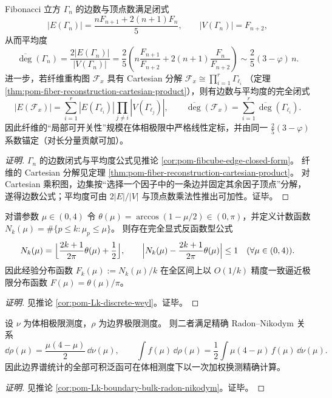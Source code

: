 \begin{conclusion}\label{con:xi-terminal-fibcube-edge-avg-degree-closed}
Fibonacci 立方 \(\Gamma_n\) 的边数与顶点数满足闭式
\[
|E(\Gamma_n)|=\frac{nF_{n+1}+2(n+1)F_n}{5},
\qquad
|V(\Gamma_n)|=F_{n+2},
\]
从而平均度
\[
\overline{\deg}(\Gamma_n)
=\frac{2|E(\Gamma_n)|}{|V(\Gamma_n)|}
=\frac{2}{5}\left(
n\frac{F_{n+1}}{F_{n+2}}+2(n+1)\frac{F_n}{F_{n+2}}
\right)
\sim \frac{2}{5}(3-\varphi)\,n.
\]
进一步，若纤维重构图 \(\mathcal F_x\) 具有 Cartesian 分解
\(
\mathcal F_x\cong\prod_{i=1}^r\Gamma_{\ell_i}
\)
（定理 \ref{thm:pom-fiber-reconstruction-cartesian-product}），则有边数与平均度的完全闭式
\[
|E(\mathcal F_x)|
=\sum_{i=1}^r |E(\Gamma_{\ell_i})|\prod_{j\ne i}|V(\Gamma_{\ell_j})|,
\qquad
\overline{\deg}(\mathcal F_x)=\sum_{i=1}^r \overline{\deg}(\Gamma_{\ell_i}).
\]
因此纤维的“局部可开关性”规模在体相极限中严格线性定标，并由同一 \(\frac{2}{5}(3-\varphi)\) 系数锚定（对长分量贡献可加）。
\end{conclusion}
\begin{proof}[证明]
\(\Gamma_n\) 的边数闭式与平均度公式见推论 \ref{cor:pom-fibcube-edge-closed-form}。
纤维的 Cartesian 分解见定理 \ref{thm:pom-fiber-reconstruction-cartesian-product}。
对 Cartesian 乘积图，边集按“选择一个因子中的一条边并固定其余因子顶点”分解，遂得边数公式；平均度可由
\(
2|E|/|V|
\)
与顶点数乘法性推出可加性。证毕。
\end{proof}

\begin{conclusion}\label{con:xi-terminal-discrete-weyl-strong-remainder}
对谱参数 \(\mu\in(0,4)\) 令 \(\theta(\mu)=\arccos(1-\mu/2)\in(0,\pi)\)，并定义计数函数
\(
N_k(\mu)=\#\{p\le k:\mu_p\le\mu\}
\)。
则存在完全显式反函数型公式
\[
N_k(\mu)=\Bigl\lfloor \frac{2k+1}{2\pi}\theta(\mu)+\frac12\Bigr\rfloor,
\qquad
\Bigl|N_k(\mu)-\frac{2k+1}{2\pi}\theta(\mu)\Bigr|\le 1
\quad(\forall\mu\in(0,4)).
\]
因此经验分布函数 \(F_k(\mu):=N_k(\mu)/k\) 在全区间上以 \(O(1/k)\) 精度一致逼近极限分布函数 \(F(\mu)=\theta(\mu)/\pi\)。
\end{conclusion}
\begin{proof}[证明]
见推论 \ref{cor:pom-Lk-discrete-weyl}。证毕。
\end{proof}

\begin{conclusion}[边界谱律是体相谱律的严格二次倾斜：\texorpdfstring{$\dd\rho(\mu)=\frac{\mu(4-\mu)}{2}\,\dd\nu(\mu)$}{d rho=(mu(4-mu)/2)d nu}]\label{con:xi-terminal-boundary-bulk-spectral-quadratic-tilt}
设 \(\nu\) 为体相极限测度，\(\rho\) 为边界极限测度。
则二者满足精确 Radon--Nikodym 关系
\[
\dd\rho(\mu)=\frac{\mu(4-\mu)}{2}\,\dd\nu(\mu),
\qquad
\int f(\mu)\,\dd\rho(\mu)=\frac12\int \mu(4-\mu)\,f(\mu)\,\dd\nu(\mu).
\]
因此边界谱统计的全部可积泛函可在体相测度下以一次加权换测精确计算。
\end{conclusion}
\begin{proof}[证明]
见推论 \ref{cor:pom-Lk-boundary-bulk-radon-nikodym}。证毕。
\end{proof}

